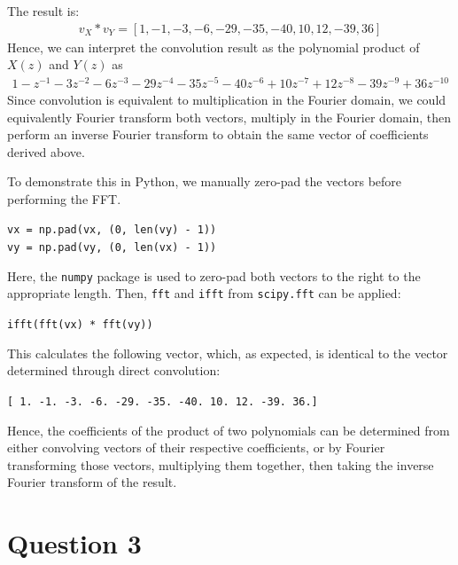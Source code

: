 \documentclass[a4paper, 11pt]{article}
\begin{document}
The result is:
\begin{align*}
    v_X \ast v_Y = [1, -1, -3, -6, -29, -35, -40, 10, 12, -39, 36]
\end{align*}
Hence, we can interpret the convolution result as the polynomial product of
$X(z)$ and $Y(z)$ as
\begin{align*}
    1 - z^{-1} - 3z^{-2} - 6z^{-3} - 29z^{-4} - 35z^{-5} - 40z^{-6} + 10z^{-7} +
    12z^{-8} - 39z^{-9} + 36z^{-10}
\end{align*}
Since convolution is equivalent to multiplication in the Fourier domain, we
could equivalently Fourier transform both vectors, multiply in the Fourier
domain, then perform an inverse Fourier transform to obtain the same vector of
coefficients derived above.

To demonstrate this in Python, we manually zero-pad the vectors before
performing the FFT.
\begin{center}
    \texttt{vx = np.pad(vx, (0, len(vy) - 1))} \\
    \texttt{vy = np.pad(vy, (0, len(vx) - 1))}
\end{center}
Here, the \texttt{numpy} package is used to zero-pad both vectors to the right
to the appropriate length. Then, \texttt{fft} and \texttt{ifft} from
\texttt{scipy.fft} can be applied:
\begin{center}
    \texttt{ifft(fft(vx) * fft(vy))}
\end{center}
This calculates the following vector, which, as expected, is identical to the
vector determined through direct convolution:
\begin{center}
    \texttt{[  1.  -1.  -3.  -6. -29. -35. -40.  10.  12. -39.  36.]}
\end{center}
Hence, the coefficients of the product of two polynomials can be determined from
either convolving vectors of their respective coefficients, or by Fourier
transforming those vectors, multiplying them together, then taking the inverse
Fourier transform of the result.

\newpage
\section*{Question 3}
\end{document}
